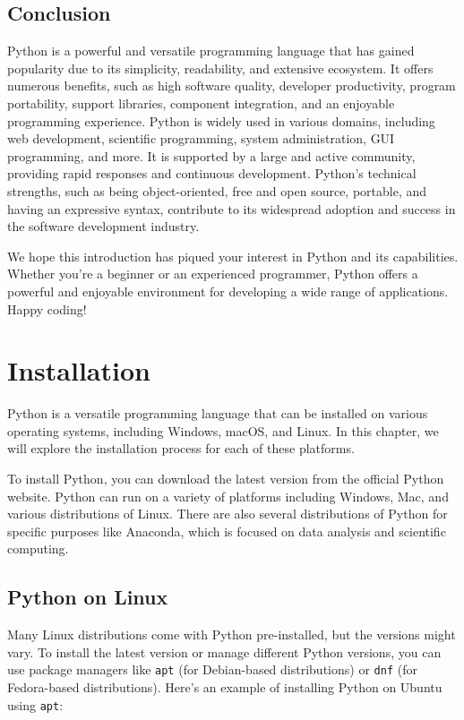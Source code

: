 \documentclass[12pt]{book}
\begin{document}
\section{Conclusion}

Python is a powerful and versatile programming language that has gained popularity due to its simplicity, readability, and extensive ecosystem. It offers numerous benefits, such as high software quality, developer productivity, program portability, support libraries, component integration, and an enjoyable programming experience. Python is widely used in various domains, including web development, scientific programming, system administration, GUI programming, and more. It is supported by a large and active community, providing rapid responses and continuous development. Python's technical strengths, such as being object-oriented, free and open source, portable, and having an expressive syntax, contribute to its widespread adoption and success in the software development industry.

We hope this introduction has piqued your interest in Python and its capabilities. Whether you're a beginner or an experienced programmer, Python offers a powerful and enjoyable environment for developing a wide range of applications. Happy coding!


\chapter{Installation}
Python is a versatile programming language that can be installed on various operating systems, including Windows, macOS, and Linux. In this chapter, we will explore the installation process for each of these platforms.

To install Python, you can download the latest version from the official Python website. Python can run on a variety of platforms including Windows, Mac, and various distributions of Linux. There are also several distributions of Python for specific purposes like Anaconda, which is focused on data analysis and scientific computing.


\section{Python on Linux}

Many Linux distributions come with Python pre-installed, but the versions might vary. To install the latest version or manage different Python versions, you can use package managers like \texttt{apt} (for Debian-based distributions) or \texttt{dnf} (for Fedora-based distributions). Here's an example of installing Python on Ubuntu using \texttt{apt}:
\end{document}
